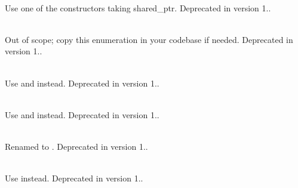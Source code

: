 \begin{DoxyRefList}
\item[Member \doxylink{class_quant_lib_1_1_relinkable_handle_a3eb68df0a3bf75915d1ebbd07f4b57e5}{Quant\+Lib\+::Relinkable\+Handle\texorpdfstring{$<$}{<} T \texorpdfstring{$>$}{>}\+::Relinkable\+Handle} (T \texorpdfstring{$\ast$}{*}p, bool register\+As\+Observer=true)]\hfill \\
\label{deprecated__deprecated000047}%
%
Use one of the constructors taking shared\+\_\+ptr. Deprecated in version 1..  
\item[Member \doxylink{namespace_quant_lib_aec640f352a6039438786a95fc53edb98}{Quant\+Lib\+::Sensitivity\+Analysis} ]\hfill \\
\label{deprecated__deprecated000029}%
%
Out of scope; copy this enumeration in your codebase if needed. Deprecated in version 1..  
\item[Class \doxylink{class_quant_lib_1_1_spread_option}{Quant\+Lib\+::Spread\+Option} ]\hfill \\
\label{deprecated__deprecated000022}%
%
Use  and  instead. Deprecated in version 1..  
\item[Class \doxylink{class_quant_lib_1_1_spread_option_1_1engine}{Quant\+Lib\+::Spread\+Option\+::engine} ]\hfill \\
\label{deprecated__deprecated000023}%
%
Use  and  instead. Deprecated in version 1..  
\item[Member \doxylink{namespace_quant_lib_a3196129d3f811280b103721dfef66585}{Quant\+Lib\+::Sub\+Periods\+Coupon} ]\hfill \\
\label{deprecated__deprecated000003}%
%
Renamed to . Deprecated in version 1..  
\item[Class \doxylink{class_quant_lib_1_1_sub_periods_leg}{Quant\+Lib\+::Sub\+Periods\+Leg} ]\hfill \\
\label{deprecated__deprecated000007}%
%
Use  instead. Deprecated in version 1..  
\item[Member \doxylink{namespace_quant_lib_a2e6f80fabd8719564fdf60881ad5fec7}{Quant\+Lib\+::Sub\+Periods\+Pricer} ]\hfill \\

\end{DoxyRefList}
